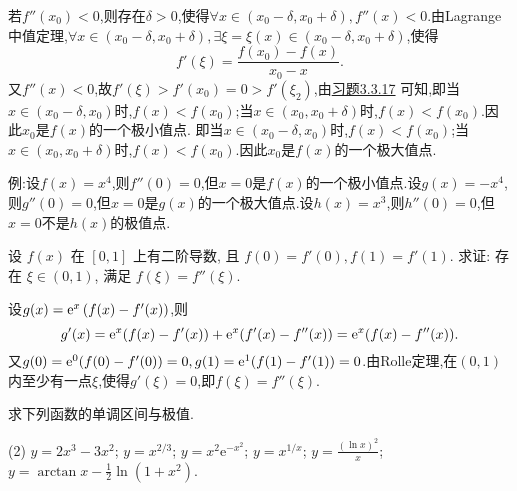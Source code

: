 \begin{solution}
    若$f''(x_0) < 0$,则存在$\delta > 0$,使得$\forall x \in (x_0 - \delta, x_0 + \delta), f''(x) < 0$.由Lagrange中值定理,$\forall x\in (x_0 - \delta, x_0 + \delta),\exists \xi=\xi(x) \in (x_0 - \delta, x_0 + \delta)$,使得
    $$
        f'(\xi) = \frac{f(x_0)-f(x)}{x_0 - x}.
    $$
    又$f''(x) < 0$,故$f'(\xi) > f'(x_0) = 0 > f'(\xi_2)$,由\hyperref[ex:3.3.17]{习题3.3.17} 可知,即当$x \in (x_0 - \delta, x_0)$时,$f(x) < f(x_0)$;当$x \in (x_0, x_0 + \delta)$时,$f(x) < f(x_0)$.因此$x_0$是$f(x)$的一个极小值点.
    即当$x \in (x_0 - \delta, x_0)$时,$f(x) < f(x_0)$;当$x \in (x_0, x_0 + \delta)$时,$f(x) < f(x_0)$.因此$x_0$是$f(x)$的一个极大值点.

    例:设$f(x) = x^4$,则$f''(0) = 0$,但$x = 0$是$f(x)$的一个极小值点.设$g(x) = -x^4$,则$g''(0) = 0$,但$x = 0$是$g(x)$的一个极大值点.设$h(x) = x^3$,则$h''(0) = 0$,但$x = 0$不是$h(x)$的极值点.
\end{solution}

\begin{exercise}[3.3.20]
    设 $f(x)$ 在 $[0,1]$ 上有二阶导数, 且 $f(0)=f'(0), f(1)=f'(1)$. 求证: 存在 $\xi \in (0,1)$, 满足 $f(\xi)=f''(\xi)$.
\end{exercise}

\begin{solution}
    设$g(x) = \mathrm{e}^x \left( f(x) - f'(x) \right)$,则
    $$
        g'(x) = \mathrm{e}^x (f(x) - f'(x)) + \mathrm{e}^x (f'(x) - f''(x)) = \mathrm{e}^x (f(x) - f''(x)).
    $$
    又$g(0) = \mathrm{e}^0 (f(0) - f'(0)) = 0, g(1) = \mathrm{e}^1 (f(1) - f'(1)) = 0$.由Rolle定理,在$(0,1)$内至少有一点$\xi$,使得$g'(\xi) = 0$,即$f(\xi) = f''(\xi)$.
\end{solution}

\begin{exercise}[3.3.21]
    求下列函数的单调区间与极值.
    \begin{tasks}[label=(\arabic*)](2)
        \task $y = 2x^3-3x^2$;
        \task $y = x^{2/3}$;
        \task $y = x^2\mathrm{e}^{-x^2}$;
        \task $y = x^{1/x}$;
        \task $y = \frac{(\ln x)^2}{x}$;
        \task $y = \arctan x - \frac{1}{2}\ln(1+x^2)$.
    \end{tasks}
\end{exercise}

